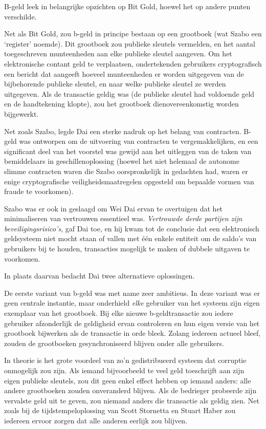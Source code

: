 \documentclass[
  a5paper,
  smalldemyvopaper,11pt,twoside,onecolumn,openright,extrafontsizes]{memoir}
\begin{document}
B-geld leek in belangrijke opzichten op Bit Gold, hoewel het op andere
punten verschilde.

Net als Bit Gold, zou b-geld in principe bestaan op een grootboek (wat
Szabo een `register' noemde). Dit grootboek zou publieke sleutels
vermelden, en het aantal toegeschreven munteenheden aan elke publieke
sleutel aangeven. Om het elektronische contant geld te verplaatsen,
ondertekenden gebruikers cryptografisch een bericht dat aangeeft hoeveel
munteenheden er worden uitgegeven van de bijbehorende publieke sleutel,
en naar welke publieke sleutel ze werden uitgegeven. Als de transactie
geldig was (de publieke sleutel had voldoende geld en de handtekening
klopte), zou het grootboek dienovereenkomstig worden bijgewerkt.

Net zoals Szabo, legde Dai een sterke nadruk op het belang van
contracten. B-geld was ontworpen om de uitvoering van contracten te
vergemakkelijken, en een significant deel van het voorstel was gewijd
aan het uitleggen van de taken van bemiddelaars in geschillenoplossing
(hoewel het niet helemaal de autonome slimme contracten waren die Szabo
oorspronkelijk in gedachten had, waren er enige cryptografische
veiligheidsmaatregelen opgesteld om bepaalde vormen van fraude te
voorkomen).

Szabo was er ook in geslaagd om Wei Dai ervan te overtuigen dat het
minimaliseren van vertrouwen essentieel was. \emph{Vertrouwde derde
partijen zijn beveiligingsrisico's}, gaf Dai toe, en hij kwam tot de
conclusie dat een elektronisch geldsysteem niet mocht staan of vallen
met één enkele entiteit om de saldo's van gebruikers bij te houden,
transacties mogelijk te maken of dubbele uitgaven te voorkomen.

In plaats daarvan bedacht Dai twee alternatieve oplossingen.

De eerste variant van b-geld was met name zeer ambitieus. In deze
variant was er geen centrale instantie, maar onderhield \emph{elke}
gebruiker van het systeem zijn eigen exemplaar van het grootboek. Bij
elke nieuwe b-geldtransactie zou iedere gebruiker afzonderlijk de
geldigheid ervan controleren en hun eigen versie van het grootboek
bijwerken als de transactie in orde bleek. Zolang iedereen actueel
bleef, zouden de grootboeken gesynchroniseerd blijven onder alle
gebruikers.

In theorie is het grote voordeel van zo'n gedistribueerd systeem dat
corruptie onmogelijk zou zijn. Als iemand bijvoorbeeld te veel geld
toeschrijft aan zijn eigen publieke sleutels, zou dit geen enkel effect
hebben op iemand anders: alle andere grootboeken zouden onveranderd
blijven. Als de bedrieger probeerde zijn vervalste geld uit te geven,
zou niemand anders die transactie als geldig zien. Net zoals bij de
tijdstempeloplossing van Scott Stornetta en Stuart Haber zou iedereen
ervoor zorgen dat alle anderen eerlijk zou blijven.
\end{document}

